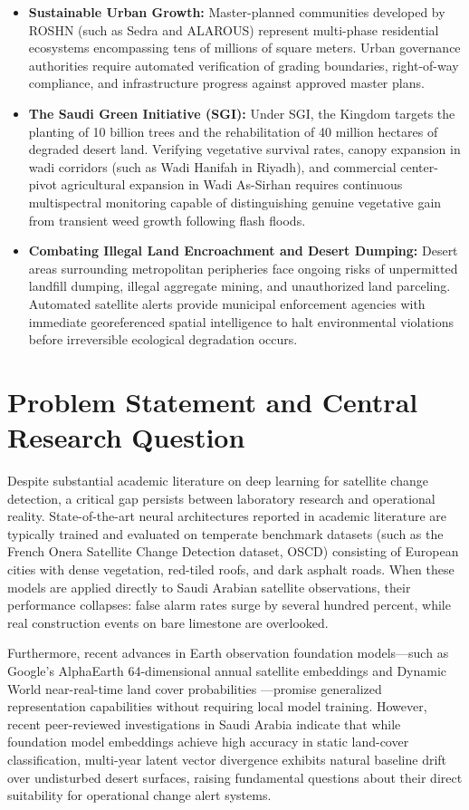 \begin{itemize}
    \item \textbf{Sustainable Urban Growth:} Master-planned communities developed by ROSHN (such as Sedra and ALAROUS) represent multi-phase residential ecosystems encompassing tens of millions of square meters. Urban governance authorities require automated verification of grading boundaries, right-of-way compliance, and infrastructure progress against approved master plans.
    \item \textbf{The Saudi Green Initiative (SGI):} Under SGI, the Kingdom targets the planting of 10 billion trees and the rehabilitation of 40 million hectares of degraded desert land. Verifying vegetative survival rates, canopy expansion in wadi corridors (such as Wadi Hanifah in Riyadh), and commercial center-pivot agricultural expansion in Wadi As-Sirhan requires continuous multispectral monitoring capable of distinguishing genuine vegetative gain from transient weed growth following flash floods.
    \item \textbf{Combating Illegal Land Encroachment and Desert Dumping:} Desert areas surrounding metropolitan peripheries face ongoing risks of unpermitted landfill dumping, illegal aggregate mining, and unauthorized land parceling. Automated satellite alerts provide municipal enforcement agencies with immediate georeferenced spatial intelligence to halt environmental violations before irreversible ecological degradation occurs.
\end{itemize}

\section{Problem Statement and Central Research Question}
\label{sec:intro_problem}
Despite substantial academic literature on deep learning for satellite change detection, a critical gap persists between laboratory research and operational reality. State-of-the-art neural architectures reported in academic literature are typically trained and evaluated on temperate benchmark datasets (such as the French Onera Satellite Change Detection dataset, OSCD) consisting of European cities with dense vegetation, red-tiled roofs, and dark asphalt roads. When these models are applied directly to Saudi Arabian satellite observations, their performance collapses: false alarm rates surge by several hundred percent, while real construction events on bare limestone are overlooked.

Furthermore, recent advances in Earth observation foundation models—such as Google's AlphaEarth 64-dimensional annual satellite embeddings \citep{brown2025alphaearth} and Dynamic World near-real-time land cover probabilities \citep{brown2022dynamicworld}—promise generalized representation capabilities without requiring local model training. However, recent peer-reviewed investigations in Saudi Arabia \citep{manikandan2026alphaearth} indicate that while foundation model embeddings achieve high accuracy in static land-cover classification, multi-year latent vector divergence exhibits natural baseline drift over undisturbed desert surfaces, raising fundamental questions about their direct suitability for operational change alert systems.

